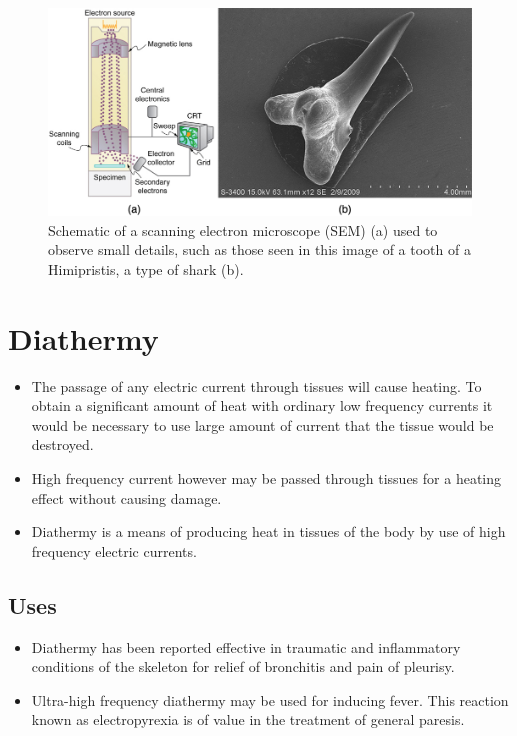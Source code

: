 \documentclass[12pt]{book}
\begin{document}
\begin{figure}
    \centering
    \includegraphics[width=\linewidth]{sem.jpeg}
    \caption{Schematic of a scanning electron microscope (SEM) (a) used to observe small details, such as those seen in this image of a tooth of a Himipristis, a type of shark (b).}%
    \label{fig:sem}
\end{figure}
\section{Diathermy}
\begin{itemize}
    \item The passage of any electric current through tissues will cause
heating. To obtain a significant amount of heat with ordinary low
frequency currents it would be necessary to use large amount of
current that the tissue would be destroyed.

\item High frequency current
however may be passed through tissues for a heating effect without
causing damage.

\item Diathermy is a means of producing heat in tissues
of the body by use of high frequency electric currents.
\end{itemize}
\subsection{Uses}
\begin{itemize}
\item Diathermy has been reported effective in traumatic and
inflammatory conditions of the skeleton for relief of bronchitis
and pain of pleurisy.
\item Ultra-high frequency diathermy may be used for inducing fever.
This reaction known as electropyrexia is of value in the treatment
of general paresis.
\end{itemize}


\end{document}
